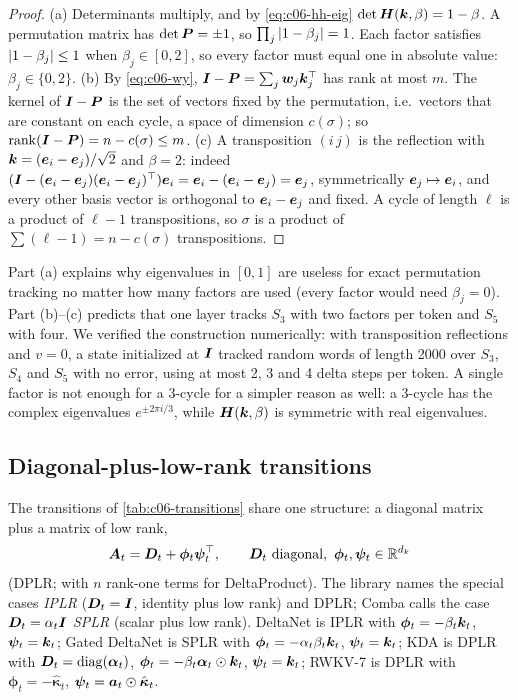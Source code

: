 \begin{proof}
(a) Determinants multiply, and by \eqref{eq:c06-hh-eig}
$\det\bm{H}(\bm{k},\beta)=1-\beta$. A permutation matrix has $\det\bm{P}=\pm1$, so
$\prod_j\left\lvert 1-\beta_j\right\rvert=1$. Each factor satisfies $\left\lvert 1-\beta_j\right\rvert\le1$ when
$\beta_j\in[0,2]$, so every factor must equal one in absolute value: $\beta_j\in\{0,2\}$.
(b) By \eqref{eq:c06-wy}, $\bm{I}-\bm{P}=\sum_{j}\bm{w}_j\bm{k}_j^{\top}$ has rank at most $m$. The kernel of
$\bm{I}-\bm{P}$ is the set of vectors fixed by the permutation, i.e.\ vectors that are constant
on each cycle, a space of dimension $c(\sigma)$; so $\operatorname{rank}(\bm{I}-\bm{P})=n-c(\sigma)\le m$.
(c) A transposition $(i\,j)$ is the reflection with $\bm{k}=(\bm{e}_i-\bm{e}_j)/\sqrt2$ and $\beta=2$:
indeed $(\bm{I}-(\bm{e}_i-\bm{e}_j)(\bm{e}_i-\bm{e}_j)^{\top})\bm{e}_i=\bm{e}_i-(\bm{e}_i-\bm{e}_j)=\bm{e}_j$, symmetrically
$\bm{e}_j\mapsto\bm{e}_i$, and every other basis vector is orthogonal to $\bm{e}_i-\bm{e}_j$ and fixed. A
cycle of length $\ell$ is a product of $\ell-1$ transpositions, so $\sigma$ is a product of
$\sum(\ell-1)=n-c(\sigma)$ transpositions.
\end{proof}

Part (a) explains why eigenvalues in $[0,1]$ are useless for exact permutation tracking no
matter how many factors are used (every factor would need $\beta_j=0$). Part (b)--(c)
predicts that one layer tracks $S_3$ with two factors per token and $S_5$ with four. We
verified the construction numerically: with transposition reflections and $v=0$, a state
initialized at $\bm{I}$ tracked random words of length 2000 over $S_3$, $S_4$ and $S_5$ with no
error, using at most 2, 3 and 4 delta steps per token. A single factor is not enough for a
3-cycle for a simpler reason as well: a 3-cycle has the complex eigenvalues
$e^{\pm2\pi i/3}$, while $\bm{H}(\bm{k},\beta)$ is symmetric with real eigenvalues.

\subsection{Diagonal-plus-low-rank transitions}\label{sec:c06-dplr}

The transitions of \cref{tab:c06-transitions} share one structure: a diagonal matrix plus
a matrix of low rank,
\begin{equation}\label{eq:c06-dplr}
  \mA_t=\mD_t+\bm\phi_t\bm\psi_t\T,\qquad \mD_t \text{ diagonal},\ \bm\phi_t,\bm\psi_t\in\R^{d_k}
\end{equation}
(DPLR; with $n$ rank-one terms for DeltaProduct). The \fla{} library names the special
cases \emph{IPLR} ($\bm{D}_t=\bm{I}$, identity plus low rank) and DPLR; Comba calls the case
$\bm{D}_t=\alpha_t\bm{I}$ \emph{SPLR} (scalar plus low rank). DeltaNet is IPLR with
$\bm\phi_t=-\beta_t\bm{k}_t$, $\bm\psi_t=\bm{k}_t$; Gated DeltaNet is SPLR with
$\bm\phi_t=-\alpha_t\beta_t\bm{k}_t$, $\bm\psi_t=\bm{k}_t$; KDA is DPLR with
$\bm{D}_t=\operatorname{diag}(\bm{\alpha}_t)$, $\bm\phi_t=-\beta_t\bm{\alpha}_t\odot\bm{k}_t$, $\bm\psi_t=\bm{k}_t$; RWKV-7 is DPLR with
$\bm\phi_t=-\hat{\bm\kappa}_t$, $\bm\psi_t=\bm{a}_t\odot\hat{\bm\kappa}_t$.

